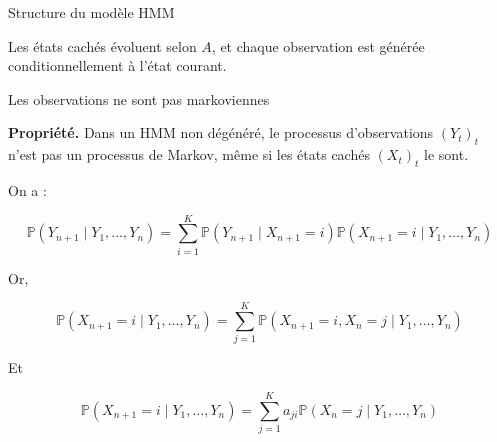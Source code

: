\documentclass{beamer}
\begin{document}
\begin{frame}{Structure du modèle HMM}

\centering


\vspace{0.4cm}

\small
Les états cachés évoluent selon \(A\), et chaque observation est générée conditionnellement à l'état courant.

\end{frame}


\begin{frame}{Les observations ne sont pas markoviennes}

\small

\textbf{Propriété.}
Dans un HMM non dégénéré, le processus d'observations \((Y_t)_t\) n'est pas un processus de Markov, même si les états cachés \((X_t)_t\) le sont.

\vspace{0.35cm}
On a : 

\[
\mathbb{P}(Y_{n+1}\mid Y_1,\dots,Y_n)
=
\sum_{i=1}^{K}
\mathbb{P}(Y_{n+1}\mid X_{n+1}=i)
\mathbb{P}(X_{n+1}=i\mid Y_1,\dots,Y_n)
\]

Or,

\[
\mathbb{P}(X_{n+1}=i\mid Y_1,\dots,Y_n)
=
\sum_{j=1}^{K}
\mathbb{P}(X_{n+1}=i,X_n=j\mid Y_1,\dots,Y_n)
\]

Et

\[
\mathbb{P}(X_{n+1}=i\mid Y_1,\dots,Y_n)
=
\sum_{j=1}^{K}
a_{ji}\mathbb{P}(X_n=j\mid Y_1,\dots,Y_n)
\]

\end{frame}
\end{document}
